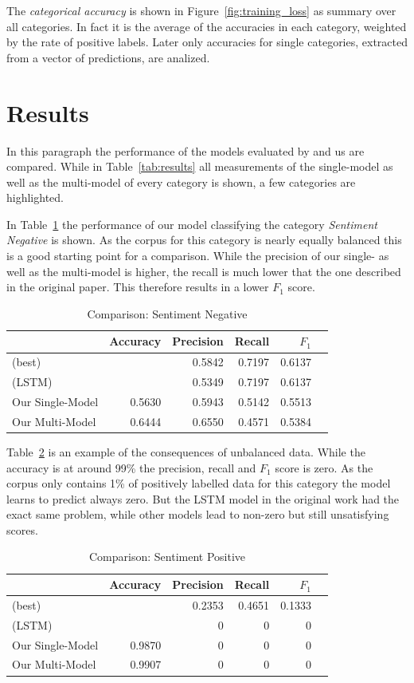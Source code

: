 \documentclass[11pt,a4paper]{article}
\begin{document}
The \textit{categorical accuracy} is shown in Figure~\ref{fig:training_loss} as summary over all categories. In fact it is the average of the accuracies in each category, weighted by the rate of positive labels. Later only accuracies for single categories, extracted from a vector of predictions, are analized.


\section{Results}
In this paragraph the performance of the models evaluated by  and us are compared.
While in Table~\ref{tab:results} all measurements of the single-model as well as the multi-model of every category is shown, a few categories are highlighted.

In Table~\ref{tab:results:sentiment_negative} the performance of our model classifying the category \textit{Sentiment Negative} is shown. As the corpus for this category is nearly equally balanced this is a good starting point for a comparison. While the precision of our single- as well as the multi-model is higher, the recall is much lower that the one described in the original paper. This therefore results in a lower $F_1$ score.
\begin{table}[h!]
	\centering\tiny
	\begin{tabular}{l r r r r r}
		& Accuracy & Precision & Recall & $F_1$ \\
		\hline
		\cite{Schabus17} (best) & & 0.5842 & 0.7197 & 0.6137 \\
		\cite{Schabus17} (LSTM) & & 0.5349 & 0.7197 & 0.6137 \\
		\hline
		Our Single-Model & 0.5630 & 0.5943 & 0.5142 & 0.5513\\
		Our Multi-Model & 0.6444 & 0.6550 & 0.4571 & 0.5384 \\
	\end{tabular}  
	\caption{Comparison: Sentiment Negative}
	\label{tab:results:sentiment_negative}
\end{table}

Table~\ref{tab:results:sentiment_positive} is an example of the consequences of unbalanced data. While the accuracy is at around 99\% the precision, recall and $F_1$ score is zero. As the corpus only contains 1\% of positively labelled data for this category the model learns to predict always zero.
But the LSTM model in the original work had the exact same problem, while other models lead to non-zero but still unsatisfying scores.
\begin{table}[h!]
	\centering\tiny
	\begin{tabular}{l r r r r r}
		& Accuracy & Precision & Recall & $F_1$ \\
		\hline
		\cite{Schabus17} (best) & & 0.2353 & 0.4651 & 0.1333 \\
		\cite{Schabus17} (LSTM) & & 0 & 0 & 0\\
		\hline
		Our Single-Model & 0.9870 & 0 & 0 & 0 \\
		Our Multi-Model & 0.9907 & 0 & 0 & 0 \\
	\end{tabular}
	\caption{Comparison: Sentiment Positive}
	\label{tab:results:sentiment_positive}
\end{table}
\end{document}
